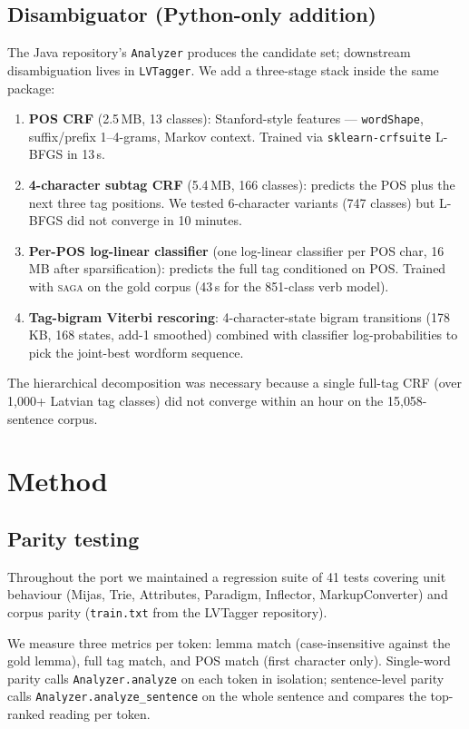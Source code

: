 \documentclass[11pt,a4paper]{article}
\begin{document}
\subsection{Disambiguator (Python-only addition)}

The Java repository's \texttt{Analyzer} produces the candidate set; downstream
disambiguation lives in \texttt{LVTagger}. We add a three-stage stack inside
the same package:
\begin{enumerate}
\item \textbf{POS CRF} (2.5\,MB, 13 classes):
  Stanford-style features --- \texttt{wordShape}, suffix/prefix 1--4-grams,
  Markov context. Trained via \texttt{sklearn-crfsuite} L-BFGS in 13\,s.
\item \textbf{4-character subtag CRF} (5.4\,MB, 166 classes): predicts the
  POS plus the next three tag positions. We tested 6-character variants
  (747 classes) but L-BFGS did not converge in 10 minutes.
\item \textbf{Per-POS log-linear classifier} (one log-linear classifier
  per POS char, 16\,MB after sparsification): predicts the full tag conditioned
  on POS. Trained with \textsc{saga} \cite{defazio2014} on the gold corpus
  (43\,s for the 851-class verb model).
\item \textbf{Tag-bigram Viterbi rescoring}: 4-character-state bigram
  transitions (178\,KB, 168 states, add-1 smoothed) combined with classifier
  log-probabilities to pick the joint-best wordform sequence.
\end{enumerate}
The hierarchical decomposition was necessary because a single full-tag CRF
(over 1{,}000+ Latvian tag classes) did not converge within an hour on the
15{,}058-sentence corpus.

\section{Method}

\subsection{Parity testing}

Throughout the port we maintained a regression suite of 41 tests covering
unit behaviour (Mijas, Trie, Attributes, Paradigm, Inflector, MarkupConverter)
and corpus parity (\texttt{train.txt} from the LVTagger repository).

We measure three metrics per token: lemma match (case-insensitive against the
gold lemma), full tag match, and POS match (first character only). Single-word
parity calls \texttt{Analyzer.analyze} on each token in isolation;
sentence-level parity calls \texttt{Analyzer.analyze\_sentence} on the whole
sentence and compares the top-ranked reading per token.
\end{document}

